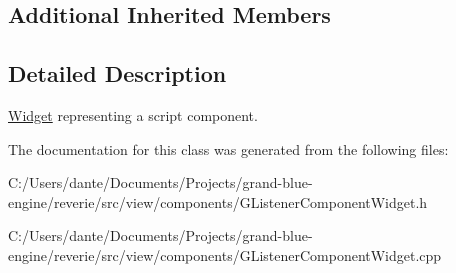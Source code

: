 \subsection*{Additional Inherited Members}


\subsection{Detailed Description}
\mbox{\hyperlink{class_widget}{Widget}} representing a script component. 

The documentation for this class was generated from the following files\+:\begin{DoxyCompactItemize}
\item 
C\+:/\+Users/dante/\+Documents/\+Projects/grand-\/blue-\/engine/reverie/src/view/components/G\+Listener\+Component\+Widget.\+h\item 
C\+:/\+Users/dante/\+Documents/\+Projects/grand-\/blue-\/engine/reverie/src/view/components/G\+Listener\+Component\+Widget.\+cpp\end{DoxyCompactItemize}
